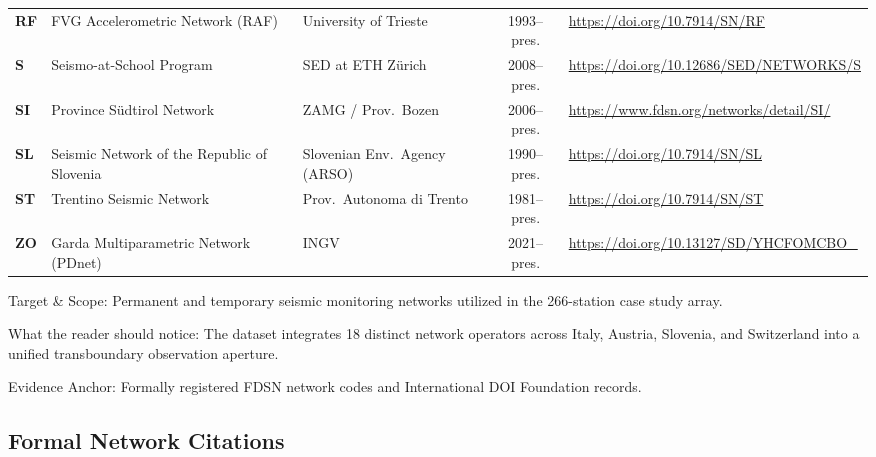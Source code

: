 \begin{table}[htbp]
\begin{threeparttable}
\begin{tabularx}{\linewidth}{l l l c X}
      \textbf{RF} & FVG Accelerometric Network (RAF) & University of Trieste & 1993--pres. & \url{https://doi.org/10.7914/SN/RF} \\
      \textbf{S}  & Seismo-at-School Program & SED at ETH Z\"urich & 2008--pres. & \url{https://doi.org/10.12686/SED/NETWORKS/S} \\
      \textbf{SI} & Province S\"udtirol Network & ZAMG / Prov.\ Bozen & 2006--pres. & \url{https://www.fdsn.org/networks/detail/SI/} \\
      \textbf{SL} & Seismic Network of the Republic of Slovenia & Slovenian Env.\ Agency (ARSO) & 1990--pres. & \url{https://doi.org/10.7914/SN/SL} \\
      \textbf{ST} & Trentino Seismic Network & Prov.\ Autonoma di Trento & 1981--pres. & \url{https://doi.org/10.7914/SN/ST} \\
      \textbf{ZO} & Garda Multiparametric Network (PDnet) & INGV & 2021--pres. & \url{https://doi.org/10.13127/SD/YHCFOMCBO_} \\
      \bottomrule
    \end{tabularx}
    \begin{tablenotes}[flushleft]
      \footnotesize
      \item Target \& Scope: Permanent and temporary seismic monitoring networks utilized in the 266-station case study array.
      \item What the reader should notice: The dataset integrates 18 distinct network operators across Italy, Austria, Slovenia, and Switzerland into a unified transboundary observation aperture.
      \item Evidence Anchor: Formally registered FDSN network codes and International DOI Foundation records.
    \end{tablenotes}
  \end{threeparttable}
\end{table}

\subsection*{Formal Network Citations}


